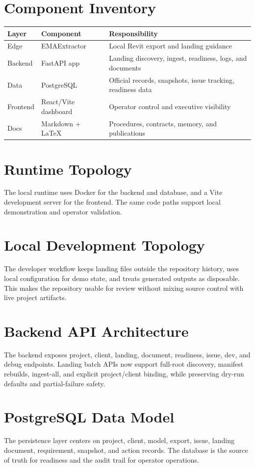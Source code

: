 \documentclass[11pt]{article}
\begin{document}
\section{Component Inventory}
\begin{longtable}{@{}llp{7.6cm}@{}}
\toprule
Layer & Component & Responsibility \\
\midrule
\endhead
Edge & EMAExtractor & Local Revit export and landing guidance \\
Backend & FastAPI app & Landing discovery, ingest, readiness, logs, and documents \\
Data & PostgreSQL & Official records, snapshots, issue tracking, readiness data \\
Frontend & React/Vite dashboard & Operator control and executive visibility \\
Docs & Markdown + LaTeX & Procedures, contracts, memory, and publications \\
\bottomrule
\end{longtable}

\section{Runtime Topology}
The local runtime uses Docker for the backend and database, and a Vite development server for the frontend. The same code paths support local demonstration and operator validation.

\section{Local Development Topology}
The developer workflow keeps landing files outside the repository history, uses local configuration for demo state, and treats generated outputs as disposable. This makes the repository usable for review without mixing source control with live project artifacts.

\section{Backend API Architecture}
The backend exposes project, client, landing, document, readiness, issue, dev, and debug endpoints. Landing batch APIs now support full-root discovery, manifest rebuilds, ingest-all, and explicit project/client binding, while preserving dry-run defaults and partial-failure safety.

\section{PostgreSQL Data Model}
The persistence layer centers on project, client, model, export, issue, landing document, requirement, snapshot, and action records. The database is the source of truth for readiness and the audit trail for operator operations.
\end{document}
